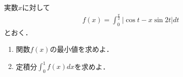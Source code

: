 \documentclass[../../main.tex]{subfiles}
\begin{document}
実数$x$に対して
\begin{align}
  f(x)=\int_0^{\displaystyle\frac{\pi}{2}}|\cos t-x\sin 2t|dt
\end{align}
とおく．
\begin{enumerate}
  \item 関数$f(x)$の最小値を求めよ．
  \item 定積分$\displaystyle\int_0^1f(x)dx$を求めよ．
\end{enumerate}
\end{document}
